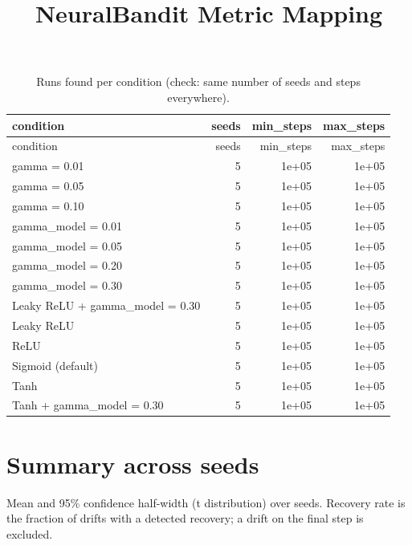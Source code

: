 \documentclass[
  letterpaper,
  DIV=11,
  numbers=noendperiod]{scrartcl}
\title{NeuralBandit Metric Mapping}
\author{}
\date{}
\begin{document}
\maketitle


\begin{longtable}[]{@{}lrrr@{}}
\caption{Runs found per condition (check: same number of seeds and steps
everywhere).}\tabularnewline
\toprule\noalign{}
condition & seeds & min\_steps & max\_steps \\
\midrule\noalign{}
\endfirsthead
\toprule\noalign{}
condition & seeds & min\_steps & max\_steps \\
\midrule\noalign{}
\endhead
\bottomrule\noalign{}
\endlastfoot
gamma = 0.01 & 5 & 1e+05 & 1e+05 \\
gamma = 0.05 & 5 & 1e+05 & 1e+05 \\
gamma = 0.10 & 5 & 1e+05 & 1e+05 \\
gamma\_model = 0.01 & 5 & 1e+05 & 1e+05 \\
gamma\_model = 0.05 & 5 & 1e+05 & 1e+05 \\
gamma\_model = 0.20 & 5 & 1e+05 & 1e+05 \\
gamma\_model = 0.30 & 5 & 1e+05 & 1e+05 \\
Leaky ReLU + gamma\_model = 0.30 & 5 & 1e+05 & 1e+05 \\
Leaky ReLU & 5 & 1e+05 & 1e+05 \\
ReLU & 5 & 1e+05 & 1e+05 \\
Sigmoid (default) & 5 & 1e+05 & 1e+05 \\
Tanh & 5 & 1e+05 & 1e+05 \\
Tanh + gamma\_model = 0.30 & 5 & 1e+05 & 1e+05 \\
\end{longtable}

\section{Summary across seeds}\label{summary-across-seeds}

Mean and 95\% confidence half-width (t distribution) over seeds.
Recovery rate is the fraction of drifts with a detected recovery; a
drift on the final step is excluded.
\end{document}
